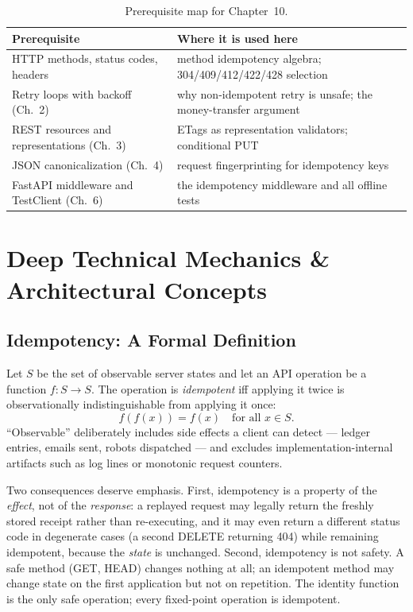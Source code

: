 \begin{table}[h]
  \centering
  \small
  \begin{tabularx}{\textwidth}{l X}
    \toprule
    \textbf{Prerequisite} & \textbf{Where it is used here} \\
    \midrule
    HTTP methods, status codes, headers & method idempotency algebra; 304/409/412/422/428 selection \\
    Retry loops with backoff (Ch.~2) & why non-idempotent retry is unsafe; the money-transfer argument \\
    REST resources and representations (Ch.~3) & ETags as representation validators; conditional PUT \\
    JSON canonicalization (Ch.~4) & request fingerprinting for idempotency keys \\
    FastAPI middleware and TestClient (Ch.~6) & the idempotency middleware and all offline tests \\
    \bottomrule
  \end{tabularx}
  \caption{Prerequisite map for Chapter~10.}
  \label{tab:ch10-prereqs}
\end{table}

\section{Deep Technical Mechanics \& Architectural Concepts}
\label{sec:ch10-mechanics}

\subsection{Idempotency: A Formal Definition}
\label{sec:ch10-idempotency-formal}

\begin{definition}
\label{def:idempotent}
Let $S$ be the set of observable server states and let an API operation be a
function $f : S \to S$. The operation is \emph{idempotent} iff applying it
twice is observationally indistinguishable from applying it once:
\[
  f(f(x)) = f(x) \quad \text{for all } x \in S.
\]
``Observable'' deliberately includes side effects a client can detect ---
ledger entries, emails sent, robots dispatched --- and excludes
implementation-internal artifacts such as log lines or monotonic request
counters.
\end{definition}

Two consequences deserve emphasis. First, idempotency is a property of the
\emph{effect}, not of the \emph{response}: a replayed request may legally
return the freshly stored receipt rather than re-executing, and it may even
return a different status code in degenerate cases (a second DELETE
returning 404) while remaining idempotent, because the \emph{state} is
unchanged. Second, idempotency is not safety. A safe method (GET, HEAD)
changes nothing at all; an idempotent method may change state on the first
application but not on repetition. The identity function is the only safe
operation; every fixed-point operation is idempotent.

